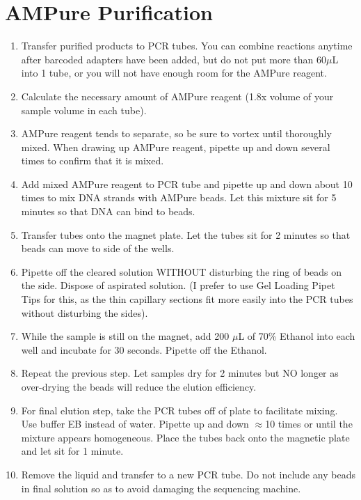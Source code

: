 \documentclass{article}
\begin{document}
\section{AMPure Purification}
\begin{enumerate}	
	\item Transfer purified products to PCR tubes.  You can combine reactions anytime after barcoded adapters have been added, but do not put more than 60$\mu$L into 1 tube, or you will not have enough room for the AMPure reagent.
	\item Calculate the necessary amount of AMPure reagent (1.8x volume of  your sample volume in each tube).
	\item AMPure reagent tends to separate, so be sure to vortex until thoroughly mixed.  When drawing up AMPure reagent, pipette up and down several times to confirm that it is mixed.
	\item Add mixed AMPure reagent to PCR tube and pipette up and down about 10 times to mix DNA strands with AMPure beads.  Let this mixture sit for 5 minutes so that DNA can bind to beads.  
	\item Transfer tubes onto the magnet plate.  Let the tubes sit for 2 minutes so that beads can move to side of the wells.  
	\item Pipette off the cleared solution WITHOUT disturbing the ring of beads on the side.  Dispose of aspirated solution. (I prefer to use Gel Loading Pipet Tips for this, as the thin capillary sections fit more easily into the PCR tubes without disturbing the sides).
	\item While the sample is still on the magnet, add 200 $\mu$L of 70\% Ethanol into each well and incubate for 30 seconds. Pipette off the Ethanol.
	\item Repeat the previous step. Let samples dry for 2 minutes but NO longer as over-drying the beads will reduce the elution efficiency.
	\item For final elution step, take the PCR tubes off of plate to facilitate mixing.  Use buffer EB instead of water. Pipette up and down $\approx$10 times or until the mixture appears homogeneous.  Place the tubes back onto the magnetic plate and let sit for 1 minute.  
	\item Remove the liquid and transfer to a new PCR tube.  Do not include any beads in final solution so as to avoid damaging the sequencing machine.
\end{enumerate}
\end{document}
